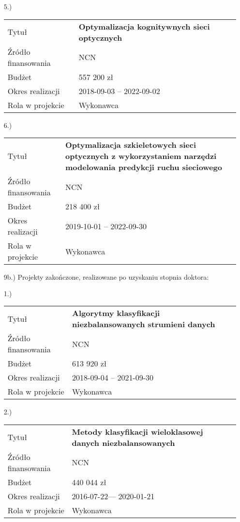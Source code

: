 \begin{fullwidth}
\begin{itemize}
\item[5.)]~\\
\begin{tabular}{p{10em}|p{20em}}
Tytuł &	\textbf{Optymalizacja kognitywnych sieci optycznych}\\
Źródło finansowania & NCN\\
Budżet & 557 200 zł\\
Okres realizacji & 2018-09-03 – 2022-09-02\\
Rola w projekcie & Wykonawca
\end{tabular}

\item[6.)]~\\
\begin{tabular}{p{10em}|p{20em}}
Tytuł &	\textbf{Optymalizacja szkieletowych sieci optycznych z wykorzystaniem narzędzi modelowania predykcji ruchu sieciowego}\\
Źródło finansowania & NCN\\
Budżet & 218 400 zł\\
Okres realizacji & 2019-10-01 – 2022-09-30\\
Rola w projekcie & Wykonawca
\end{tabular}
		
		\item[9b.)] Projekty zakończone, realizowane po uzyskaniu stopnia doktora:

\item[1.)]~\\
\begin{tabular}{p{10em}|p{20em}}
Tytuł &	\textbf{Algorytmy klasyfikacji niezbalansowanych strumieni danych}\\
Źródło finansowania & NCN\\
Budżet & 613 920 zł\\
Okres realizacji & 2018-09-04 – 2021-09-30\\
Rola w projekcie & Wykonawca
\end{tabular}

\item[2.)]~\\
\begin{tabular}{p{10em}|p{20em}}
Tytuł &	\textbf{Metody klasyfikacji wieloklasowej danych niezbalansowanych}\\
Źródło finansowania & NCN\\
Budżet & 440 044 zł\\
Okres realizacji & 2016-07-22— 2020-01-21\\
Rola w projekcie & Wykonawca
\end{tabular}


\end{itemize}
\end{fullwidth}
